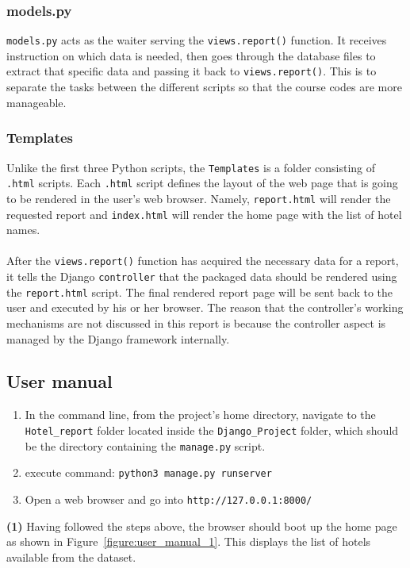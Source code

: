 \documentclass[a4paper]{report}
\newcommand{\code}[1]{\texttt{#1}}
\begin{document}
\subsubsection{models.py}
\code{models.py} acts as the waiter serving the \code{views.report()} function. It receives instruction on which data is needed, then goes through the database files to extract that specific data and passing it back to \code{views.report()}. This is to separate the tasks between the different scripts so that the course codes are more manageable.  

\subsubsection{Templates}
Unlike the first three Python scripts, the \code{Templates} is a folder consisting of \code{.html} scripts. Each \code{.html} script defines the layout of the web page that is going to be rendered in the user's web browser. Namely, \code{report.html} will render the requested report and \code{index.html} will render the home page with the list of hotel names. 
\\\\
After the \code{views.report()} function has acquired the necessary data for a report, it tells the Django \code{controller} that the packaged data should be rendered using the \code{report.html} script. The final rendered report page will be sent back to the user and executed by his or her browser. The reason that the controller's working mechanisms are not discussed in this report is because the controller aspect is managed by the Django framework internally. 

\subsection{User manual}
\begin{enumerate}
	\item In the command line, from the project's home directory, navigate to the \code{Hotel\_report} folder located inside the \code{Django\_Project} folder, which should be the directory containing the \code{manage.py} script.
	\item execute command: \code{python3 manage.py runserver}
	\item Open a web browser and go into \code{http://127.0.0.1:8000/}
\end{enumerate}

\noindent
\textbf{(1)} Having followed the steps above, the browser should boot up the home page as shown in Figure~\ref{figure:user_manual_1}. This displays the list of hotels available from the dataset.
\end{document}
